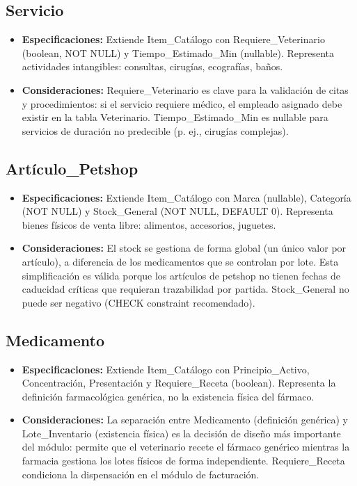\subsection{Servicio}

\begin{itemize}
	\item \textbf{Especificaciones:} Extiende Item\_Catálogo con Requiere\_Veterinario (boolean, NOT NULL) y Tiempo\_Estimado\_Min (nullable). Representa actividades intangibles: consultas, cirugías, ecografías, baños.
	\item \textbf{Consideraciones:} Requiere\_Veterinario es clave para la validación de citas y procedimientos: si el servicio requiere médico, el empleado asignado debe existir en la tabla Veterinario. Tiempo\_Estimado\_Min es nullable para servicios de duración no predecible (p. ej., cirugías complejas).
\end{itemize}

\subsection{Artículo\_Petshop}

\begin{itemize}
	\item \textbf{Especificaciones:} Extiende Item\_Catálogo con Marca (nullable), Categoría (NOT NULL) y Stock\_General (NOT NULL, DEFAULT 0). Representa bienes físicos de venta libre: alimentos, accesorios, juguetes.
	\item \textbf{Consideraciones:} El stock se gestiona de forma global (un único valor por artículo), a diferencia de los medicamentos que se controlan por lote. Esta simplificación es válida porque los artículos de petshop no tienen fechas de caducidad críticas que requieran trazabilidad por partida. Stock\_General no puede ser negativo (CHECK constraint recomendado).
\end{itemize}

\subsection{Medicamento}

\begin{itemize}
	\item \textbf{Especificaciones:} Extiende Item\_Catálogo con Principio\_Activo, Concentración, Presentación y Requiere\_Receta (boolean). Representa la definición farmacológica genérica, no la existencia física del fármaco.
	\item \textbf{Consideraciones:} La separación entre Medicamento (definición genérica) y Lote\_Inventario (existencia física) es la decisión de diseño más importante del módulo: permite que el veterinario recete el fármaco genérico mientras la farmacia gestiona los lotes físicos de forma independiente. Requiere\_Receta condiciona la dispensación en el módulo de facturación.
\end{itemize}

